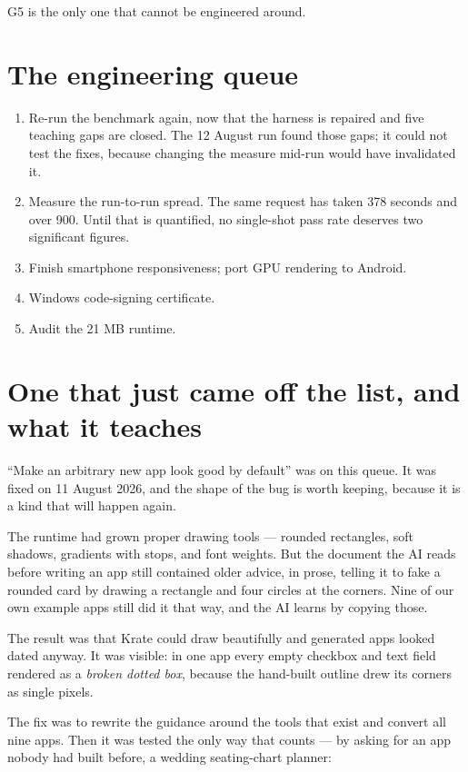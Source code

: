 \documentclass[11pt,a4paper]{report}
\begin{document}
G5 is the only one that cannot be engineered around.

\section{The engineering queue}

\begin{enumerate}[leftmargin=*]
  \item Re-run the benchmark again, now that the harness is repaired and
    five teaching gaps are closed. The 12 August run found those gaps; it
    could not test the fixes, because changing the measure mid-run would
    have invalidated it.
  \item Measure the run-to-run spread. The same request has taken 378
    seconds and over 900. Until that is quantified, no single-shot pass
    rate deserves two significant figures.
  \item Finish smartphone responsiveness; port GPU rendering to Android.
  \item Windows code-signing certificate.
  \item Audit the 21 MB runtime.
\end{enumerate}

\section{One that just came off the list, and what it teaches}

``Make an arbitrary new app look good by default'' was on this queue. It
was fixed on 11 August 2026, and the shape of the bug is worth keeping,
because it is a kind that will happen again.

The runtime had grown proper drawing tools --- rounded rectangles, soft
shadows, gradients with stops, and font weights. But the document the AI
reads before writing an app still contained older advice, in prose, telling
it to fake a rounded card by drawing a rectangle and four circles at the
corners. Nine of our own example apps still did it that way, and the AI
learns by copying those.

The result was that Krate could draw beautifully and generated apps looked
dated anyway. It was visible: in one app every empty checkbox and text
field rendered as a \emph{broken dotted box}, because the hand-built
outline drew its corners as single pixels.

The fix was to rewrite the guidance around the tools that exist and convert
all nine apps. Then it was tested the only way that counts --- by asking
for an app nobody had built before, a wedding seating-chart planner:
\end{document}
